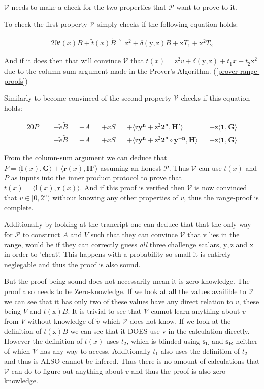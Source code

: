 \documentclass{article}
\newcommand{\eq}[1]{\begin{alignat*}{20}#1\end{alignat*}}
\renewcommand{\vec}[1]{\boldsymbol{#1}}
\newcommand{\ran}[1]{\mathrm{#1}}
\newcommand{\vecran}[1]{\mathbf{#1}}
\newcommand{\V}{\mathcal{V}}
\renewcommand{\P}{\mathcal{P}}
\newcommand{\tB}{\widetilde{B}}
\renewcommand{\tt}{\widetilde{t}}
\newcommand{\tv}{\widetilde{v}}
\newcommand{\dotp}[2]{\langle #1, #2 \rangle}
\begin{document}
$\V$ needs to make a check for the two properties that $\P$ want to prove to it.

To check the first property $\V$ simply checks if the following equation holds:

\eq{
	t(x)B + \tt(x)\tB \stackrel{?}{=} \ran{z^2} + \delta(\ran{y},\ran{z})B + \ran{x}T_1 + \ran{x^2}T_2
}

And if it does then that will convince $\V$ that $t(x) = \ran{z^2}v + \delta(\ran{y},\ran{z}) + t_1x + t_2\ran{x^2}$ due to the column-sum argument made in the Prover's Algorithm. (\ref{prover-range-proofs})

Similarly to become convinced of the second property $\V$ checks if this equation holds:

\eq{
	P &= -\widetilde{e}\tB &&+ A &&+ xS &&+ \dotp{\ran{z}\vecran{y^n} + \ran{z^2}\vec{2^n}}{\vec{H'}} &&- \ran{z}\dotp{\vec{1}}{\vec{\vec{G}}} \\
	&= -\widetilde{e}\tB &&+ A &&+ xS &&+ \dotp{\ran{z}\vecran{y^n} + \ran{z^2}\vec{2^n}\circ\vecran{y^{-n}}}{\vec{H}} &&- \ran{z}\dotp{\vec{1}}{\vec{G}}
}

From the column-sum argument we can deduce that $P = \dotp{\vec{l}(x)}{\vec{G}} + \dotp{\vec{r}(x)}{\vec{H'}}$ assuming an honest $\P$. Thus $\V$ can use $t(x)$ and $P$ as inputs into the inner product protocol to prove that $ t(x) = \dotp{\vec{l}(x)}{\vec{r}(x)}$. And if this proof is verified then $\V$ is now convinced that $v\in [0,2^n)$ without knowing any other properties of $v$, thus the range-proof is complete.

Additionally by looking at the trancript one can deduce that that the only way for $\P$ to construct $A$ and $V$ such that they can convince $\V$ that v lies in the range, would be if they can correctly guess \textit{all} three challenge scalars, $\ran{y}, \ran{z}$ and $\ran{x}$ in order to 'cheat'. This happens with a probability so small it is entirely neglegable and thus the proof is also sound.

But the proof being sound does not necessarily mean it is zero-knowledge. The proof also needs to be Zero-knowledge. If we look at all the values availible to $\V$ we can see that it has only two of these values have any direct relation to $v$, these being $V$ and $t(\ran{x})B$. It is trivial to see that $\V$ cannot learn anything about $v$ from $V$ without knowledge of $\tv$ which $\V$ does not know. If we look at the definition of $t(\ran{x})B$ we can see that it DOES use v in the calculation directly. However the definition of $t(x)$ uses $t_2$, which is blinded using $\vecran{s_L}$ and $\vecran{s_R}$ neither of which $\V$ has any way to access. Additionally $t_1$ also uses the definition of $t_2$ and thus is ALSO cannot be infered. Thus there is no amount of calculations that $\V$ can do to figure out anything about $v$ and thus the proof is also zero-knowledge.
\end{document}
